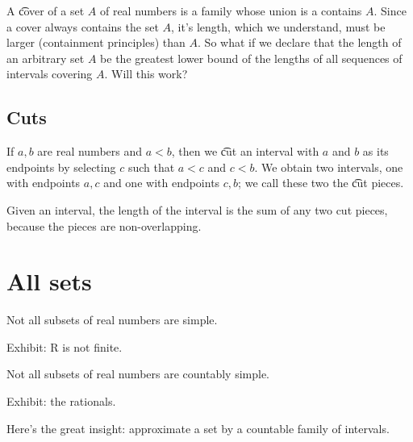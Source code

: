 A \t{cover} of a set $A$ of real numbers is a family whose union is a contains $A$. Since a cover always contains the set $A$, it's length, which we understand, must be larger (containment principles) than $A$.
So what if we declare that the length of an arbitrary set $A$ be the greatest lower bound of the lengths of all sequences of intervals covering $A$. Will this work?

\subsection*{Cuts}

If $a, b$ are real numbers and $a < b$, then we \t{cut} an interval with $a$ and $b$ as its endpoints by selecting $c$ such that $a < c$ and $c < b$.
We obtain two intervals, one with endpoints $a,c$ and one with endpoints $c, b$; we call these two the \t{cut pieces}.

Given an interval, the length of the interval is the sum of any two cut pieces, because the pieces are non-overlapping.

\section*{All sets}

\begin{proposition}
Not all subsets of real numbers are simple.

Exhibit: R is not finite.
\end{proposition}
\begin{proposition}
Not all subsets of real numbers are countably simple.

Exhibit: the rationals.
\end{proposition}
Here's the great insight: approximate a set by a countable family of intervals.
